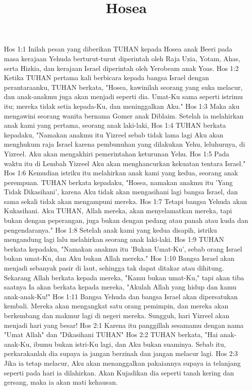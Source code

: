 

\title{Hosea}

Hos 1:1  Inilah pesan yang diberikan TUHAN kepada Hosea anak Beeri pada masa kerajaan Yehuda berturut-turut diperintah oleh Raja Uzia, Yotam, Ahas, serta Hizkia, dan kerajaan Israel diperintah oleh Yerobeam anak Yoas.
Hos 1:2  Ketika TUHAN pertama kali berbicara kepada bangsa Israel dengan perantaraanku, TUHAN berkata, "Hosea, kawinilah seorang yang suka melacur, dan anak-anakmu juga akan menjadi seperti dia. Umat-Ku sama seperti istrimu itu; mereka tidak setia kepada-Ku, dan meninggalkan Aku."
Hos 1:3  Maka aku mengawini seorang wanita bernama Gomer anak Diblaim. Setelah ia melahirkan anak kami yang pertama, seorang anak laki-laki,
Hos 1:4  TUHAN berkata kepadaku, "Namakan anakmu itu Yizreel sebab tidak lama lagi Aku akan menghukum raja Israel karena pembunuhan yang dilakukan Yehu, leluhurnya, di Yizreel. Aku akan mengakhiri pemerintahan keturunan Yehu.
Hos 1:5  Pada waktu itu di Lembah Yizreel Aku akan menghancurkan kekuatan tentara Israel."
Hos 1:6  Kemudian istriku itu melahirkan anak kami yang kedua, seorang anak perempuan. TUHAN berkata kepadaku, "Hosea, namakan anakmu itu 'Yang Tidak Dikasihani', karena Aku tidak akan mengasihani lagi bangsa Israel, dan sama sekali tidak akan mengampuni mereka.
Hos 1:7  Tetapi bangsa Yehuda akan Kukasihani. Aku TUHAN, Allah mereka, akan menyelamatkan mereka, tapi bukan dengan peperangan, juga bukan dengan pedang atau panah atau kuda dan pengendaranya."
Hos 1:8  Setelah anak kami yang kedua disapih, istriku mengandung lagi lalu melahirkan seorang anak laki-laki.
Hos 1:9  TUHAN berkata kepadaku, "Namakan anakmu itu 'Bukan Umat-Ku', sebab orang Israel bukan umat-Ku, dan Aku bukan Allah mereka."
Hos 1:10  Bangsa Israel akan menjadi sebanyak pasir di laut, sehingga tak dapat ditakar atau dihitung. Sekarang Allah berkata kepada mereka, "Kamu bukan umat-Ku," tapi akan tiba saatnya Ia akan berkata kepada mereka, "Akulah Allah yang hidup dan kamu anak-anak-Ku!"
Hos 1:11  Bangsa Yehuda dan bangsa Israel akan dipersatukan kembali. Mereka akan mengangkat satu orang pemimpin, dan mereka akan berkembang dan makmur lagi di negeri mereka. Sungguh, hari Yizreel akan menjadi hari yang besar!
Hos 2:1  Karena itu panggillah sesamamu dengan nama "Umat Allah" dan "Dikasihani TUHAN"
Hos 2:2  TUHAN berkata, "Hai anak-anak-Ku, ibumu bukan istri-Ku lagi, dan Aku bukan suaminya. Sebab itu, perkarakanlah dia supaya ia jangan berzinah dan jangan melacur lagi.
Hos 2:3  Jika ia tetap melacur, Aku akan menanggalkan pakaiannya supaya ia telanjang seperti pada hari ia dilahirkan. Akan Kujadikan dia seperti tanah kering dan gersang, maka ia akan mati kehausan.
